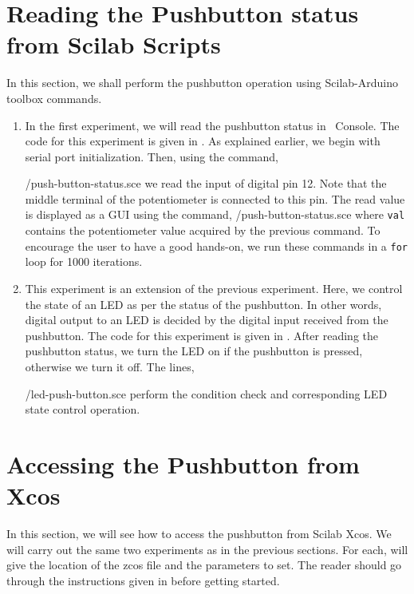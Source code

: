 \section{Reading the Pushbutton status from Scilab Scripts}
In this section, we shall perform the pushbutton operation using
Scilab-Arduino toolbox commands.
\begin{enumerate}
\item In the first experiment, we will read the pushbutton status in
  \scilab\ Console. The code for this experiment is given in
  . As explained earlier, we begin with serial
  port initialization. Then, using the command,
  
  {\LocPushscicode/push-button-status.sce} we read the input of
  digital pin 12. Note that the middle terminal of the potentiometer
  is connected to this pin. The read value is displayed as a GUI using
  the command, 
  {\LocPushscicode/push-button-status.sce} where {\tt val} contains
  the potentiometer value acquired by the previous command. To
  encourage the user to have a good hands-on, we run these commands in
  a {\tt for} loop for 1000 iterations.

\item This experiment is an extension of the previous
  experiment. Here, we control the state of an LED as per the status
  of the pushbutton. In other words, digital output to an LED is
  decided by the digital input received from the pushbutton. The code
  for this experiment is given in . After reading
  the pushbutton status, we turn the LED on if the pushbutton is
  pressed, otherwise we turn it off. The lines,
  
  {\LocPushscicode/led-push-button.sce} perform the condition check
  and corresponding LED state control operation.
\end{enumerate}

\section{Accessing the Pushbutton from Xcos}
\label{sec:push-xcos}
In this section, we will see how to access the pushbutton from Scilab
Xcos.  We will carry out the same two experiments as in the previous
sections.  For each, will give the location of the zcos file and the
parameters to set.  The reader should go through the instructions
given in  before getting started.

